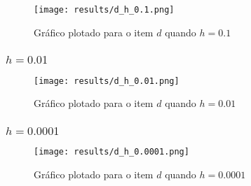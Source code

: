 \documentclass[12pt]{article}
\begin{document}
\begin{figure}[H]
    \texttt{[image: results/d\_h\_0.1.png]}
    \caption{Gráfico plotado para o item $d$ quando $h=0.1$}
\end{figure}

\subsubsection{$h=0.01$}
\begin{table}[H]
    \centering
    \caption{Item $d$, com $h=0.01$}
\end{table}

\begin{figure}[H]
    \texttt{[image: results/d\_h\_0.01.png]}
    \caption{Gráfico plotado para o item $d$ quando $h=0.01$}
\end{figure}

\subsubsection{$h=0.0001$}
\begin{table}[H]
    \centering
    \caption{Item $d$, com $h=0.0001$}
\end{table}

\begin{figure}[H]
    \texttt{[image: results/d\_h\_0.0001.png]}
    \caption{Gráfico plotado para o item $d$ quando $h=0.0001$}
\end{figure}
\end{document}
